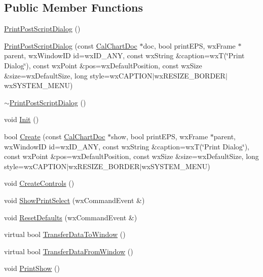 \subsection*{Public Member Functions}
\begin{DoxyCompactItemize}
\item 
\hyperlink{a00117_a973acd67871514026d3c6815df6b4d1a}{Print\-Post\-Script\-Dialog} ()
\item 
\hyperlink{a00117_a7f2218ca43f5d49abb3c91eeb2b6a6b1}{Print\-Post\-Script\-Dialog} (const \hyperlink{a00020}{Cal\-Chart\-Doc} $\ast$doc, bool print\-E\-P\-S, wx\-Frame $\ast$parent, wx\-Window\-I\-D id=wx\-I\-D\-\_\-\-A\-N\-Y, const wx\-String \&caption=wx\-T(\char`\"{}Print Dialog\char`\"{}), const wx\-Point \&pos=wx\-Default\-Position, const wx\-Size \&size=wx\-Default\-Size, long style=wx\-C\-A\-P\-T\-I\-O\-N$\vert$wx\-R\-E\-S\-I\-Z\-E\-\_\-\-B\-O\-R\-D\-E\-R$\vert$wx\-S\-Y\-S\-T\-E\-M\-\_\-\-M\-E\-N\-U)
\item 
\hyperlink{a00117_a4668da8ada0c7123674d067b30c7af05}{$\sim$\-Print\-Post\-Script\-Dialog} ()
\item 
void \hyperlink{a00117_ad67c3fb6220a1d43106f498b098d81a7}{Init} ()
\item 
bool \hyperlink{a00117_aa89c242102b84520c68711991aa1926b}{Create} (const \hyperlink{a00020}{Cal\-Chart\-Doc} $\ast$show, bool print\-E\-P\-S, wx\-Frame $\ast$parent, wx\-Window\-I\-D id=wx\-I\-D\-\_\-\-A\-N\-Y, const wx\-String \&caption=wx\-T(\char`\"{}Print Dialog\char`\"{}), const wx\-Point \&pos=wx\-Default\-Position, const wx\-Size \&size=wx\-Default\-Size, long style=wx\-C\-A\-P\-T\-I\-O\-N$\vert$wx\-R\-E\-S\-I\-Z\-E\-\_\-\-B\-O\-R\-D\-E\-R$\vert$wx\-S\-Y\-S\-T\-E\-M\-\_\-\-M\-E\-N\-U)
\item 
void \hyperlink{a00117_afc343c52a97cbcbdaef0911bb0e4291e}{Create\-Controls} ()
\item 
void \hyperlink{a00117_a02a330c8299f74e7736e1e597bba7d87}{Show\-Print\-Select} (wx\-Command\-Event \&)
\item 
void \hyperlink{a00117_aa3802f9be528c16f28ff12ebf5ae52ef}{Reset\-Defaults} (wx\-Command\-Event \&)
\item 
virtual bool \hyperlink{a00117_adafc0cf79ded97bb6314fb4544b86662}{Transfer\-Data\-To\-Window} ()
\item 
virtual bool \hyperlink{a00117_a26831daa53f32b1008ae0a7e6c90ef36}{Transfer\-Data\-From\-Window} ()
\item 
void \hyperlink{a00117_a0e77441fb7bb2b47dd7b30728b4f3088}{Print\-Show} ()
\end{DoxyCompactItemize}
